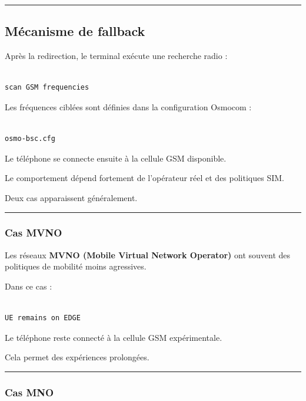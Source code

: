 \documentclass[
  french,
]{article}
\begin{document}
\begin{center}\rule{0.5\linewidth}{0.5pt}\end{center}

\subsection{Mécanisme de fallback}\label{muxe9canisme-de-fallback}

Après la redirection, le terminal exécute une recherche radio :

\begin{verbatim}

scan GSM frequencies
\end{verbatim}

Les fréquences ciblées sont définies dans la configuration Osmocom :

\begin{verbatim}

osmo-bsc.cfg
\end{verbatim}

Le téléphone se connecte ensuite à la cellule GSM disponible.

Le comportement dépend fortement de l'opérateur réel et des politiques
SIM.

Deux cas apparaissent généralement.

\begin{center}\rule{0.5\linewidth}{0.5pt}\end{center}

\subsubsection{Cas MVNO}\label{cas-mvno}

Les réseaux \textbf{MVNO (Mobile Virtual Network Operator)} ont souvent
des politiques de mobilité moins agressives.

Dans ce cas :

\begin{verbatim}

UE remains on EDGE
\end{verbatim}

Le téléphone reste connecté à la cellule GSM expérimentale.

Cela permet des expériences prolongées.

\begin{center}\rule{0.5\linewidth}{0.5pt}\end{center}

\subsubsection{Cas MNO}\label{cas-mno}
\end{document}
